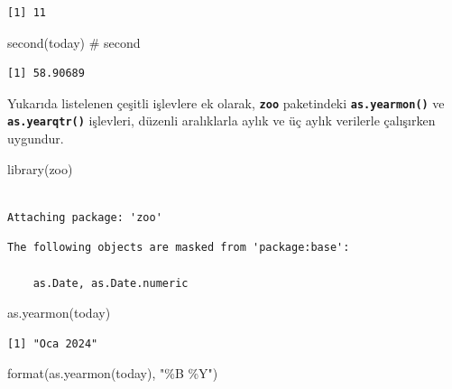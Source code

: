 \documentclass[
  letterpaper,
  DIV=11,
  numbers=noendperiod]{scrreprt}
\newenvironment{Shaded}{\begin{snugshade}}{\end{snugshade}}
\newcommand{\CommentTok}[1]{\textcolor[rgb]{0.37,0.37,0.37}{#1}}
\newcommand{\FunctionTok}[1]{\textcolor[rgb]{0.28,0.35,0.67}{#1}}
\newcommand{\NormalTok}[1]{\textcolor[rgb]{0.00,0.23,0.31}{#1}}
\newcommand{\StringTok}[1]{\textcolor[rgb]{0.13,0.47,0.30}{#1}}
\begin{document}
\begin{verbatim}
[1] 11
\end{verbatim}

\begin{Shaded}
\begin{Highlighting}[]
\FunctionTok{second}\NormalTok{(today) }\CommentTok{\# second}
\end{Highlighting}
\end{Shaded}

\begin{verbatim}
[1] 58.90689
\end{verbatim}

Yukarıda listelenen çeşitli işlevlere ek olarak, \textbf{\texttt{zoo}}
paketindeki \textbf{\texttt{as.yearmon()}} ve
\textbf{\texttt{as.yearqtr()}} işlevleri, düzenli aralıklarla aylık ve
üç aylık verilerle çalışırken uygundur.

\begin{Shaded}
\begin{Highlighting}[]
\FunctionTok{library}\NormalTok{(zoo)}
\end{Highlighting}
\end{Shaded}

\begin{verbatim}

Attaching package: 'zoo'
\end{verbatim}

\begin{verbatim}
The following objects are masked from 'package:base':

    as.Date, as.Date.numeric
\end{verbatim}

\begin{Shaded}
\begin{Highlighting}[]
\FunctionTok{as.yearmon}\NormalTok{(today)}
\end{Highlighting}
\end{Shaded}

\begin{verbatim}
[1] "Oca 2024"
\end{verbatim}

\begin{Shaded}
\begin{Highlighting}[]
\FunctionTok{format}\NormalTok{(}\FunctionTok{as.yearmon}\NormalTok{(today), }\StringTok{"\%B \%Y"}\NormalTok{)}
\end{Highlighting}
\end{Shaded}
\end{document}
